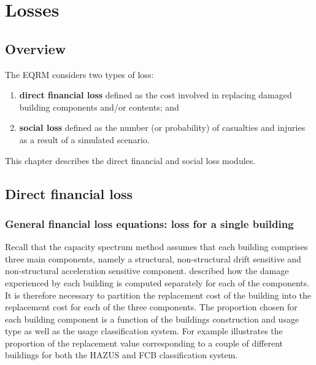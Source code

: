 \chapter{Losses}
\label{ch:losses}

\section{Overview}
The EQRM considers two types of loss:
\begin{enumerate}
\item \textbf{direct financial loss} defined as the cost involved
in replacing damaged building components and/or contents; and
\item \textbf{social loss} defined as the number (or probability)
of casualties and injuries as a result of a simulated scenario.
\end{enumerate}
This chapter describes the direct financial and social loss
modules.

\section{Direct financial loss}

\subsection{General financial loss equations: loss for a single building}

Recall that the capacity spectrum method assumes that each building comprises three main
components, namely a structural, non-structural drift sensitive
and non-structural acceleration sensitive component.
 described how the damage experienced by each
building is computed separately for each of the components. It is
therefore necessary to partition the replacement cost of the
building into the replacement cost for each of the three
components. The proportion chosen for each building component is a
function of the buildings construction and usage type as well as
the usage classification system. For example
 illustrates the proportion of the
replacement value corresponding to a couple of different buildings
for both the HAZUS and
FCB classification system. 


